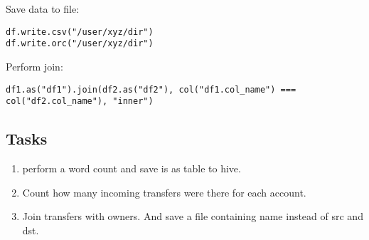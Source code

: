 \documentclass{article}
\begin{document}
Save data to file:
\begin{lstlisting}[]
df.write.csv("/user/xyz/dir")
df.write.orc("/user/xyz/dir")
\end{lstlisting}

Perform join:
\begin{lstlisting}[]
df1.as("df1").join(df2.as("df2"), col("df1.col_name") === col("df2.col_name"), "inner")
\end{lstlisting}

\subsection*{Tasks}

\begin{enumerate}
\item perform a word count and save is as table to hive.
\item Count how many incoming transfers were there for each account.
\item Join transfers with owners. And save a file containing name instead of src and dst.
\end{enumerate}
\end{document}
